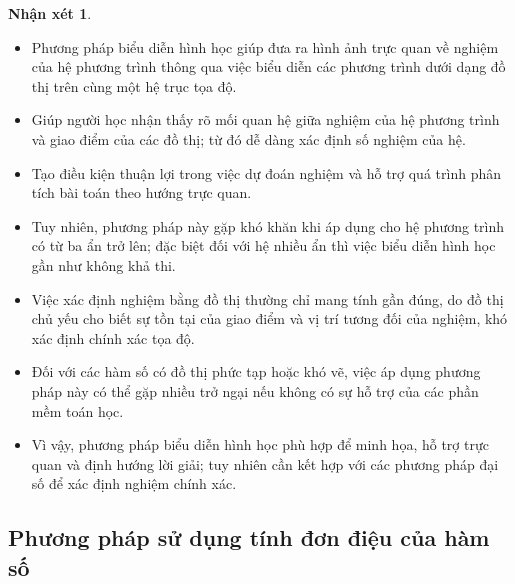\documentclass[12pt,a4paper,oneside]{book}
\theoremstyle{theorem}
\theoremstyle{definition}
\newtheorem{nx}[theorem2]{Nhận xét}
\begin{document}
\begin{nx}
    \begin{itemize}
\item Phương pháp biểu diễn hình học giúp đưa ra hình ảnh trực quan về nghiệm của hệ phương trình thông qua việc biểu diễn các phương trình dưới dạng đồ thị trên cùng một hệ trục tọa độ.
    
    \item Giúp người học nhận thấy rõ mối quan hệ giữa nghiệm của hệ phương trình và giao điểm của các đồ thị; từ đó dễ dàng xác định số nghiệm của hệ.
    
    \item Tạo điều kiện thuận lợi trong việc dự đoán nghiệm và hỗ trợ quá trình phân tích bài toán theo hướng trực quan.
    
    \item Tuy nhiên, phương pháp này gặp khó khăn khi áp dụng cho hệ phương trình có từ ba ẩn trở lên; đặc biệt đối với hệ nhiều ẩn thì việc biểu diễn hình học gần như không khả thi.
    
    \item Việc xác định nghiệm bằng đồ thị thường chỉ mang tính gần đúng, do đồ thị chủ yếu cho biết sự tồn tại của giao điểm và vị trí tương đối của nghiệm, khó xác định chính xác tọa độ.
    
    \item Đối với các hàm số có đồ thị phức tạp hoặc khó vẽ, việc áp dụng phương pháp này có thể gặp nhiều trở ngại nếu không có sự hỗ trợ của các phần mềm toán học.
    
    \item Vì vậy, phương pháp biểu diễn hình học phù hợp để minh họa, hỗ trợ trực quan và định hướng lời giải; tuy nhiên cần kết hợp với các phương pháp đại số để xác định nghiệm chính xác.
    \end{itemize}
\end{nx}
\subsection{Phương pháp sử dụng tính đơn điệu của hàm số}
\end{document}
